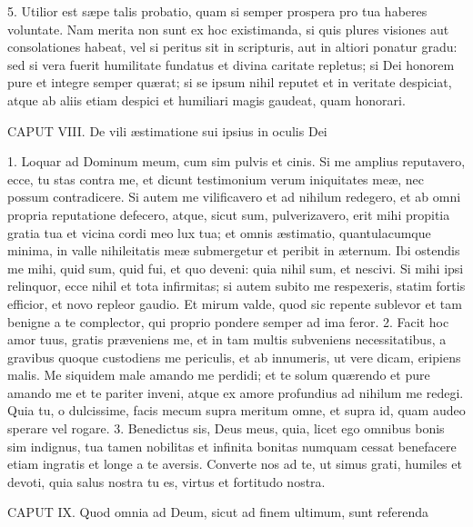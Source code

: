 5. Utilior est sæpe talis probatio, quam si semper prospera pro tua haberes voluntate. Nam merita non sunt ex hoc existimanda, si quis plures visiones aut consolationes habeat, vel si peritus sit in scripturis, aut in altiori ponatur gradu: sed si vera fuerit humilitate fundatus et divina caritate repletus; si Dei honorem pure et integre semper quærat; si se ipsum nihil reputet et in veritate despiciat, atque ab aliis etiam despici et humiliari magis gaudeat, quam honorari.


CAPUT VIII.
De vili æstimatione sui ipsius in oculis Dei

1. Loquar ad Dominum meum, cum sim pulvis et cinis. Si me amplius reputavero, ecce, tu stas contra me, et dicunt testimonium verum iniquitates meæ, nec possum contradicere. Si autem me vilificavero et ad nihilum redegero, et ab omni propria reputatione defecero, atque, sicut sum, pulverizavero, erit mihi propitia gratia tua et vicina cordi meo lux tua; et omnis æstimatio, quantulacumque minima, in valle nihileitatis meæ submergetur et peribit in æternum. Ibi ostendis me mihi, quid sum, quid fui, et quo deveni: quia nihil sum, et nescivi. Si mihi ipsi relinquor, ecce nihil et tota infirmitas; si autem subito me respexeris, statim fortis efficior, et novo repleor gaudio. Et mirum valde, quod sic repente sublevor et tam benigne a te complector, qui proprio pondere semper ad ima feror.
2. Facit hoc amor tuus, gratis præveniens me, et in tam multis subveniens necessitatibus, a gravibus quoque custodiens me periculis, et ab innumeris, ut vere dicam, eripiens malis. Me siquidem male amando me perdidi; et te solum quærendo et pure amando me et te pariter inveni, atque ex amore profundius ad nihilum me redegi. Quia tu, o dulcissime, facis mecum supra meritum omne, et supra id, quam audeo sperare vel rogare.
3. Benedictus sis, Deus meus, quia, licet ego omnibus bonis sim indignus, tua tamen nobilitas et infinita bonitas numquam cessat benefacere etiam ingratis et longe a te aversis. Converte nos ad te, ut simus grati, humiles et devoti, quia salus nostra tu es, virtus et fortitudo nostra.


CAPUT IX.
Quod omnia ad Deum, sicut ad finem ultimum, sunt referenda

